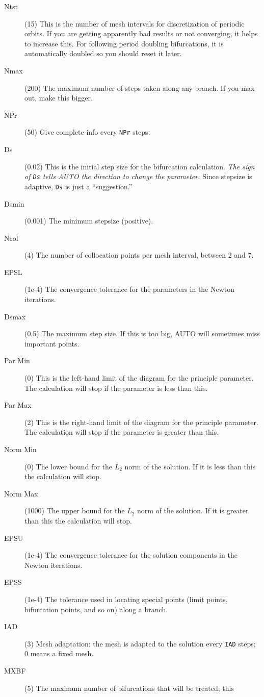 \documentclass{article}
\begin{document}
\begin{description}
\item[Ntst] (15) This is the number of mesh intervals for discretization
of periodic orbits.
If you are getting apparently bad results or not converging, it helps
to increase this.  For following period doubling bifurcations, it is
automatically doubled so you should reset it later.
\item[Nmax] (200) The maximum number of steps taken along any branch.  If
you max out, make this bigger.
\item[NPr] (50) Give complete info every {\tt NPr} steps.
\item[Ds] (0.02) This is the initial step size for the bifurcation
calculation. {\em The sign of {\tt Ds} tells AUTO the direction to
change the parameter.} Since stepsize is adaptive, {\tt Ds} is just a
``suggestion.''
\item[Dsmin] (0.001) The minimum stepsize (positive).
\item[Ncol] (4) The number of collocation points per mesh interval, between 2 and 7.
\item[EPSL] (1e-4) The convergence tolerance for the parameters in the
Newton iterations.
\item[Dsmax] (0.5) The maximum step size.  If this is too big, AUTO will
sometimes miss important points.
\item[Par Min] (0) This is the left-hand limit of the diagram for the
principle parameter. The calculation will stop if the parameter is
less than this.
\item[Par Max] (2) This is the right-hand limit of the diagram for the
principle parameter. The calculation will stop if the parameter is
greater than this.
\item[Norm Min] (0) The lower bound for the $L_2$ norm of the solution.  If it
is less than this the calculation will stop.
\item[Norm Max] (1000) The upper bound for the $L_2$ norm of the solution.  If it
is greater than this the calculation will stop.
\item[EPSU] (1e-4) The convergence tolerance for the solution components
in the Newton iterations.
\item[EPSS] (1e-4) The tolerance used in locating special points (limit
points, bifurcation points, and so on) along a branch.
\item[IAD] (3) Mesh adaptation: the mesh is adapted to the solution every {\tt IAD}
steps; 0 means a fixed mesh.
\item[MXBF] (5) The maximum number of bifurcations that will be treated; this

\end{description}
\end{document}
